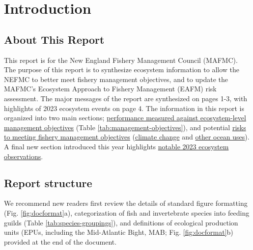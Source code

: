 \documentclass[
  10pt,
]{article}
\author{}
\date{\vspace{-2.5em}}
\begin{document}
\setcounter{page}{5}
\thispagestyle{fancy}

\hypertarget{introduction}{%
\section{Introduction}\label{introduction}}

\hypertarget{about-this-report}{%
\subsection{About This Report}\label{about-this-report}}

This report is for the New England Fishery Management Council (MAFMC). The purpose of this report is to synthesize ecosystem information to allow the NEFMC to better meet fishery management objectives, and to update the MAFMC's Ecosystem Approach to Fishery Management (EAFM) risk assessment. The major messages of the report are synthesized on pages 1-3, with highlights of 2023 ecosystem events on page 4. The information in this report is organized into two main sections; \protect\hyperlink{performance-relative-to-fishery-management-objectives}{performance measured against ecosystem-level management objectives} (Table \ref{tab:management-objectives}), and potential \protect\hyperlink{risks-to-meeting-fishery-management-objectives}{risks to meeting fishery management objectives} (\protect\hyperlink{climate-and-ecosystem-productivity}{climate change} and \protect\hyperlink{other-ocean-uses-offshore-wind}{other ocean uses}). A final new section introduced this year highlights \protect\hyperlink{2023-highlights}{notable 2023 ecosystem observations}.

\hypertarget{report-structure}{%
\subsection{Report structure}\label{report-structure}}

We recommend new readers first review the details of standard figure formatting (Fig. \ref{fig:docformat}a), categorization of fish and invertebrate species into feeding guilds (Table \ref{tab:species-groupings}), and definitions of ecological production units (EPUs, including the Mid-Atlantic Bight, MAB; Fig. \ref{fig:docformat}b) provided at the end of the document.
\end{document}
